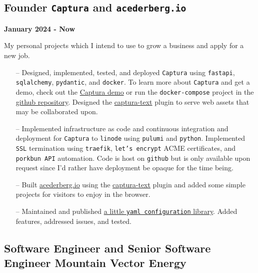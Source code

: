 \documentclass{article}
\begin{document}
\subsection*{\texorpdfstring{Founder \textbar{}  \texttt{Captura} and
\texttt{acederberg.io}}{Founder | Captura and acederberg.io}}\label{founder-of-captura-and-acederberg.io}

\textbf{January 2024 - Now}

My personal projects which I intend to use to grow a business and apply for a new job. 


\begin{itemize}
\tightlist
\item[--]
  Designed, implemented, tested, and deployed \texttt{Captura} using \texttt{fastapi}, \texttt{sqlalchemy}, \texttt{pydantic}, and \texttt{docker}. To learn
  more about \texttt{Captura} and get a demo, check out the
  \href{https://captura.acederbebrg.io}{Captura demo} or run the \texttt{docker-compose} project in the \href{https://github.com/acederberg/captura}{github repository}. Designed the \href{https://github.com/acederberg/captura-text}{captura-text} plugin to serve web assets that may be collaborated upon.
\item[--]
  Implemented infrastructure as code and continuous integration and deployment for \texttt{Captura} to \texttt{linode} using \texttt{pulumi} and \texttt{python}. Implemented \texttt{SSL} termination using \texttt{traefik}, \texttt{let's encrypt} ACME certificates, and \texttt{porkbun API} automation. Code is host on \texttt{github} but is only available upon request since I'd rather have deployment be opaque for the time being.
\item[--]
  Built \href{https://acederberg.io/home}{acederberg.io} using the \href{https://github.com/acederberg/captura-text}{captura-text} plugin and added some simple projects for visitors to enjoy in the browser.
\item[--]
  Maintained and published \href{https://github.com/acederberg/yaml-settings-pydantic}{a little \texttt{yaml configuration} library}. Added features, addressed issues, and tested.

\end{itemize}

\subsection*{Software Engineer and Senior Software Engineer \textbar{}
Mountain Vector
Energy}\label{software-engineer-and-senior-software-engineer-mountain-vector-energy}
\end{document}
